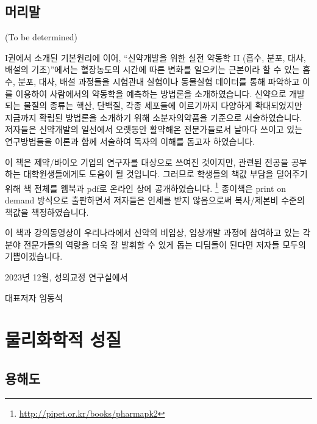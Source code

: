 \documentclass[
  11pt,
  krantz2, a4paper, twoside]{krantz}
\begin{document}
\setlength{\abovedisplayskip}{-5pt}
\setlength{\abovedisplayshortskip}{-5pt}

\newpage\thispagestyle{empty}\null

{
\hypersetup{linkcolor=}
\setcounter{tocdepth}{2}
\tableofcontents
}
\chapter*{머리말}\label{uxba38uxb9acuxb9d0}


\normalsize

(To be determined)

I권에서 소개된 기본원리에 이어, ``신약개발을 위한 실전 약동학 II (흡수, 분포, 대사, 배설의 기초)''에서는 혈장농도의 시간에 따른 변화를 일으키는 근본이라 할 수 있는 흡수, 분포, 대사, 배설 과정들을 시험관내 실험이나 동물실험 데이터를 통해 파악하고 이를 이용하여 사람에서의 약동학을 예측하는 방법론을 소개하였습니다. 신약으로 개발되는 물질의 종류는 핵산, 단백질, 각종 세포들에 이르기까지 다양하게 확대되었지만 지금까지 확립된 방법론을 소개하기 위해 소분자의약품을 기준으로 서술하였습니다. 저자들은 신약개발의 일선에서 오랫동안 활약해온 전문가들로서 날마다 쓰이고 있는 연구방법들을 이론과 함께 서술하여 독자의 이해를 돕고자 하였습니다.

이 책은 제약/바이오 기업의 연구자를 대상으로 쓰여진 것이지만, 관련된 전공을 공부하는 대학원생들에게도 도움이 될 것입니다.
그러므로 학생들의 책값 부담을 덜어주기 위해 책 전체를 웹북과 pdf로 온라인 상에 공개하였습니다. \footnote{\url{http://pipet.or.kr/books/pharmapk2}}
종이책은 print on demand 방식으로 출판하면서 저자들은 인세를 받지 않음으로써 복사/제본비 수준의 책값을 책정하였습니다.

이 책과 강의동영상이 우리나라에서 신약의 비임상, 임상개발 과정에 참여하고 있는 각 분야 전문가들의 역량을 더욱 잘 발휘할 수 있게 돕는 디딤돌이 된다면 저자들 모두의 기쁨이겠습니다.

\hfill 2023년 12월, 성의교정 연구실에서

\hfill 대표저자 임동석

\normalsize

\mainmatter

\part{물리화학적 성질}\label{part-uxbb3cuxb9acuxd654uxd559uxc801-uxc131uxc9c8}

\chapter{용해도}\label{uxc6a9uxd574uxb3c4}
\end{document}
